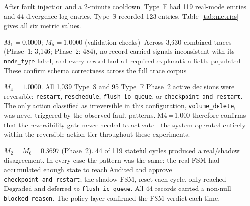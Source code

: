 \documentclass[conference]{IEEEtran}
\begin{document}
After fault injection and a 2-minute cooldown, Type~F had 119 real-mode entries and 44 divergence log entries. Type~S recorded 123 entries. Table~\ref{tab:metrics} gives all six metric values.

$M_1 = 0.0000$; $M_5 = 1.0000$ (validation checks). Across 3,630 combined traces (Phase~1: 3,146; Phase~2: 484), no record carried signals inconsistent with its \texttt{node\_type} label, and every record had all required explanation fields populated. These confirm schema correctness across the full trace corpus.

$M_4 = 1.0000$. All 1,039 Type~S and 95 Type~F Phase~2 active decisions were reversible: \texttt{restart}, \texttt{reschedule}, \texttt{flush\_io\_queue}, or \texttt{checkpoint\_and\_restart}. The only action classified as irreversible in this configuration, \texttt{volume\_delete}, was never triggered by the observed fault patterns. M4\,=\,1.000 therefore confirms that the reversibility gate never needed to activate---the system operated entirely within the reversible action tier throughout these experiments.

$M_2 = M_6 = 0.3697$ (Phase~2). 44 of 119 stateful cycles produced a real/shadow disagreement. In every case the pattern was the same: the real FSM had accumulated enough state to reach Audited and approve \texttt{checkpoint\_and\_restart}; the shadow FSM, reset each cycle, only reached Degraded and deferred to \texttt{flush\_io\_queue}. All 44 records carried a non-null \texttt{blocked\_reason}. The policy layer confirmed the FSM verdict each time.
\end{document}

